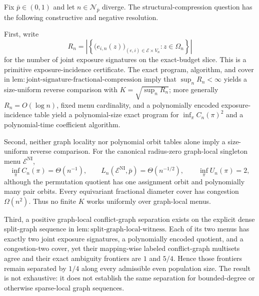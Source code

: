 Fix \(\bar p\in(0,1)\) and let \(n\in\mathcal N_{\bar p}\) diverge. The structural-compression question has the following constructive and negative resolution.

First, write
\[
 R_n=\left|\left\{\bigl(e_{i,n}(z)\bigr)_{(e,i)\in\mathcal E\times V_n}:z\in\Omega_n\right\}\right|
\]
for the number of joint exposure signatures on the exact-budget slice. This is a primitive exposure-incidence certificate. The exact program, algorithm, and cover in \(\mathrm{lem{:}joint\text{-}signature\text{-}fractional\text{-}compression}\) imply that \(\sup_nR_n<\infty\) yields a size-uniform reverse comparison with \(K=\sqrt{\sup_nR_n}\); more generally \(R_n=O(\log n)\), fixed menu cardinality, and a polynomially encoded exposure-incidence table yield a polynomial-size exact program for \(\inf_\pi C_n(\pi)^2\) and a polynomial-time coefficient algorithm.

Second, neither graph locality nor polynomial orbit tables alone imply a size-uniform reverse comparison. For the canonical radius-zero graph-local singleton menu \(\mathcal E^{\mathrm{NI}}\),
\[
 \inf_\pi C_n(\pi)=\Theta(n^{-1}),
 \qquad
 L_n(\mathcal E^{\mathrm{NI}},\bar p)=\Theta(n^{-1/2}),
 \qquad
 \inf_\pi U_n(\pi)=2, \tag{1}
\]
although the permutation quotient has one assignment orbit and polynomially many pair orbits. Every equivariant fractional diameter cover has congestion \(\Omega(n^2)\). Thus no finite \(K\) works uniformly over graph-local menus.

Third, a positive graph-local conflict-graph separation exists on the explicit dense split-graph sequence in \(\mathrm{lem{:}split\text{-}graph\text{-}local\text{-}witness}\). Each of its two menus has exactly two joint exposure signatures, a polynomially encoded quotient, and a congestion-two cover, yet their mapping-wise labeled conflict-graph multisets agree and their exact ambiguity frontiers are \(1\) and \(5/4\). Hence those frontiers remain separated by \(1/4\) along every admissible even population size. The result is not exhaustive: it does not establish the same separation for bounded-degree or otherwise sparse-local graph sequences.